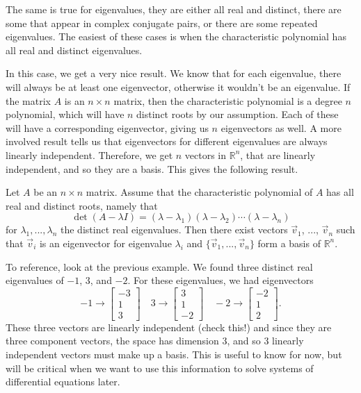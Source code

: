 The same is true for eigenvalues, they are either all real and distinct, there are some that appear in complex conjugate pairs, or there are some repeated eigenvalues. The easiest of these cases is when the characteristic polynomial has all real and distinct eigenvalues.

In this case, we get a very nice result. We know that for each eigenvalue, there will always be at least one eigenvector, otherwise it wouldn't be an eigenvalue. If the matrix $A$ is an $n \times n$ matrix, then the characteristic polynomial is a degree $n$ polynomial, which will have $n$ distinct roots by our assumption. Each of these will have a corresponding eigenvector, giving us $n$ eigenvectors as well. A more involved result tells us that eigenvectors for different eigenvalues are always linearly independent. Therefore, we get $n$ vectors in $\mathbb{R}^n$, that are linearly independent, and so they are a basis. This gives the following result.

\begin{theorem1}{}
Let $A$ be an $n \times n$ matrix. Assume that the characteristic polynomial of $A$ has all real and distinct roots, namely that
\[ \det(A - \lambda I) = (\lambda - \lambda_1)(\lambda - \lambda_2) \cdots (\lambda - \lambda_n) \] for $\lambda_1, ..., \lambda_n$ the distinct real eigenvalues. Then there exist vectors $\vec{v}_1$, ..., $\vec{v}_n$ such that $\vec{v}_i$ is an eigenvector for eigenvalue $\lambda_i$ and $\{\vec{v}_1, ..., \vec{v}_n\}$ form a basis of $\mathbb{R}^n$. 
\end{theorem1}

To reference, look at the previous example. We found three distinct real eigenvalues of $-1$, $3$, and $-2$. For these eigenvalues, we had eigenvectors
\begin{equation*}
-1 \rightarrow \begin{bmatrix} -3 \\ 1 \\ 3 \end{bmatrix} \quad 3 \rightarrow \begin{bmatrix} 3 \\ 1 \\ -2 \end{bmatrix} \quad -2 \rightarrow \begin{bmatrix} -2 \\ 1 \\ 2 \end{bmatrix}.
\end{equation*} These three vectors are linearly independent (check this!) and since they are three component vectors, the space has dimension 3, and so 3 linearly independent vectors must make up a basis. This is useful to know for now, but will be critical when we want to use this information to solve systems of differential equations later. 

